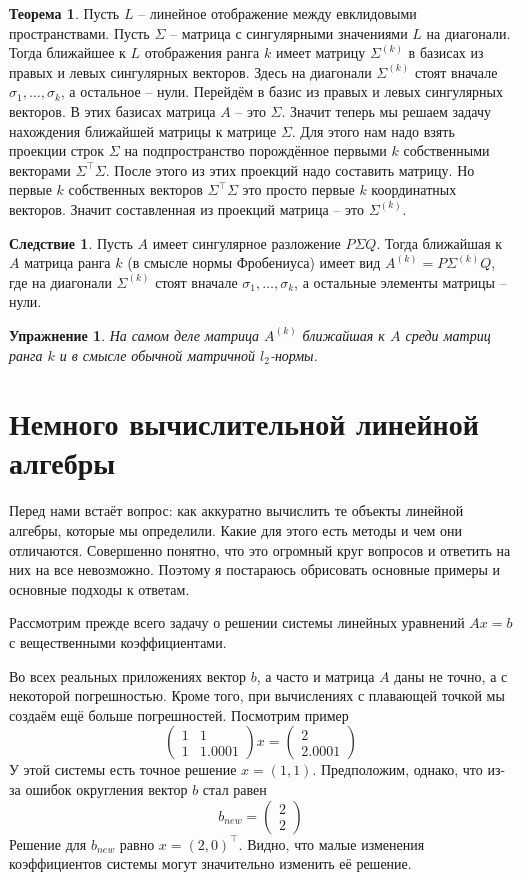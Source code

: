 \documentclass[12pt,a4paper,oneside]{book}
\newtheorem{uprz}{\color{violet!100!black} Упражнение}
\theoremstyle{definition}
\newtheorem{thm}{\color{red!40!black}Теорема}
\newtheorem{cor}{\color{green!45!black}Следствие}
\def\thrm{\begin{thm}}
\def\ethrm{\end{thm}}
\def\crl{\begin{cor}}
\def\ecrl{\end{cor}}
\def\pmat{\begin{pmatrix}}
\def\epmat{\end{pmatrix}}
\def\upr{\begin{uprz}}
\def\eupr{\end{uprz}}
\begin{document}
\thrm Пусть $L$ -- линейное отображение между евклидовыми пространствами. Пусть $\Sigma$ -- матрица с сингулярными значениями $L$ на диагонали. Тогда ближайшее к $L$ отображения ранга $k$ имеет матрицу $\Sigma^{(k)}$ в базисах из правых и левых сингулярных векторов. Здесь  на диагонали $\Sigma^{(k)}$ стоят вначале $\sigma_1,\dots,\sigma_{k}$, а остальное -- нули.
\proof Перейдём в базис из правых и левых сингулярных векторов. В этих базисах матрица $A$ -- это $\Sigma$.
Значит теперь мы решаем задачу нахождения ближайшей матрицы к матрице $\Sigma$. Для этого нам надо взять проекции строк $\Sigma$ на подпространство порождённое первыми $k$ собственными векторами $\Sigma^\top \Sigma$. После этого из этих проекций надо составить матрицу. Но первые $k$ собственных векторов $\Sigma^\top \Sigma$ это просто первые $k$ координатных векторов. Значит составленная из проекций матрица -- это $\Sigma^{(k)}$.
\endproof
\ethrm 

\crl Пусть $A$ имеет сингулярное разложение $P\Sigma Q$. Тогда ближайшая к $A$ матрица ранга $k$ (в смысле нормы Фробениуса) имеет вид $A^{(k)}=P\Sigma^{(k)}Q$, где на диагонали $\Sigma^{(k)}$ стоят вначале $\sigma_1,\dots,\sigma_{k}$, а остальные элементы матрицы -- нули.
\ecrl

\upr На самом деле матрица $A^{(k)}$ ближайшая к $A$ среди матриц ранга $k$ и в смысле обычной матричной $l_2$-нормы. 
\eupr



\section{Немного вычислительной линейной алгебры}


Перед нами встаёт вопрос: как аккуратно вычислить те объекты линейной алгебры, которые мы определили. Какие для этого есть методы и чем они отличаются. Совершенно понятно, что это огромный круг вопросов и ответить на них на все невозможно. Поэтому я постараюсь обрисовать основные примеры и основные подходы к ответам.

Рассмотрим прежде всего задачу о решении системы линейных уравнений $Ax=b$ с вещественными коэффициентами. 

Во всех реальных приложениях вектор $b$, а часто и матрица $A$ даны не точно, а с некоторой погрешностью. Кроме того, при вычислениях с плавающей точкой мы создаём ещё больше погрешностей. Посмотрим  пример
$$ \pmat 1 & 1 \\ 1 & 1.0001 \epmat x = \pmat 2\\ 2.0001 \epmat$$
У этой системы есть точное решение $x=(1,1)$. Предположим, однако, что из-за ошибок округления вектор $b$ стал равен 
$$b_{new}=\pmat 2 \\ 2 \epmat$$
Решение для $b_{new}$ равно $x=(2,0)^\top$. Видно, что малые изменения коэффициентов системы могут значительно изменить её решение.
\end{document}
